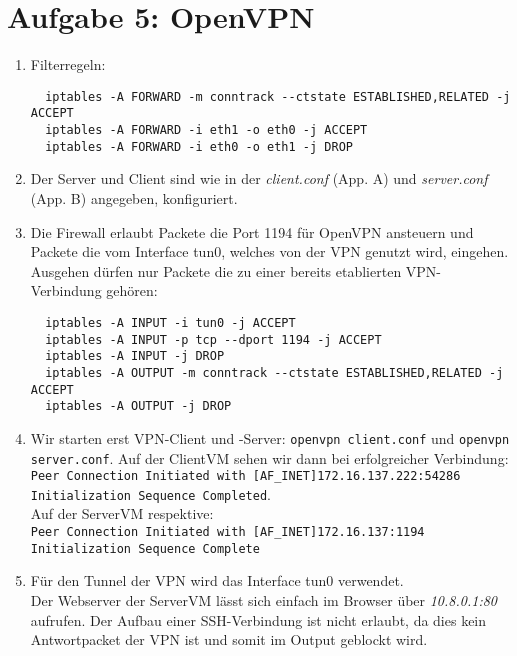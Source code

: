 \documentclass{scrartcl}
\begin{document}
	\section*{Aufgabe 5: OpenVPN}
	\label{sec:OpenVPN}
	\begin{enumerate}[\bfseries 1.]
		\item Filterregeln:
		      \begin{lstlisting}
  iptables -A FORWARD -m conntrack --ctstate ESTABLISHED,RELATED -j ACCEPT
  iptables -A FORWARD -i eth1 -o eth0 -j ACCEPT
  iptables -A FORWARD -i eth0 -o eth1 -j DROP
		\end{lstlisting}

		\item
		      Der Server und Client sind wie in der \textit{client.conf} (App. A)
		      und \textit{server.conf} (App. B) angegeben, konfiguriert.
		\item Die Firewall erlaubt Packete die Port 1194 für OpenVPN
		      ansteuern und Packete die vom Interface tun0, welches von der VPN
		      genutzt wird, eingehen.
		      Ausgehen dürfen nur Packete die zu einer bereits etablierten
		      VPN-Verbindung gehören:
		      \begin{lstlisting}
  iptables -A INPUT -i tun0 -j ACCEPT
  iptables -A INPUT -p tcp --dport 1194 -j ACCEPT
  iptables -A INPUT -j DROP
  iptables -A OUTPUT -m conntrack --ctstate ESTABLISHED,RELATED -j ACCEPT
  iptables -A OUTPUT -j DROP
		\end{lstlisting}
		\item
		      Wir starten erst VPN-Client und -Server:
		      \texttt{openvpn client.conf} und \texttt{openvpn server.conf}.
		      Auf der ClientVM sehen wir dann bei erfolgreicher Verbindung:\\
		      \texttt{Peer Connection Initiated with [AF\_INET]172.16.137.222:54286 \\
		      	Initialization Sequence Completed}.\\
		      Auf der ServerVM respektive:\\
		      \texttt{Peer Connection Initiated with [AF\_INET]172.16.137:1194 \\
		      	Initialization Sequence Complete}\\
		\item
		      Für den Tunnel der VPN wird das Interface tun0 verwendet.\\
		      Der Webserver der ServerVM lässt sich einfach im Browser über
		      \textit{10.8.0.1:80} aufrufen.
		      Der Aufbau einer SSH-Verbindung ist nicht erlaubt, da dies
		      kein Antwortpacket der VPN ist und somit im Output geblockt
		      wird.
	\end{enumerate}
\end{document}
